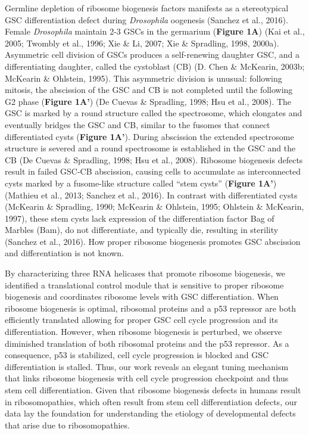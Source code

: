 \documentclass[12pt,twoside]{reedthesis}
\begin{document}
Germline depletion of ribosome biogenesis factors manifests as a
stereotypical GSC differentiation defect during \emph{Drosophila} oogenesis
(Sanchez et al., 2016). Female \emph{Drosophila} maintain 2-3 GSCs in the
germarium (\textbf{Figure 1A}) (Kai et al., 2005; Twombly et al., 1996; Xie \& Li, 2007; Xie \& Spradling, 1998, 2000a). Asymmetric cell division of GSCs produces a
self-renewing daughter GSC, and a differentiating daughter, called the
cystoblast (CB) (D. Chen \& McKearin, 2003b; McKearin \& Ohlstein, 1995). This asymmetric
division is unusual: following mitosis, the abscission of the GSC and CB
is not completed until the following G2 phase (\textbf{Figure 1A'})
(De Cuevas \& Spradling, 1998; Hsu et al., 2008). The GSC is marked by a
round structure called the spectrosome, which elongates and eventually
bridges the GSC and CB, similar to the fusomes that connect
differentiated cysts (\textbf{Figure 1A'}). During abscission the extended
spectrosome structure is severed and a round spectrosome is established
in the GSC and the CB (De Cuevas \& Spradling, 1998; Hsu et al., 2008).
Ribosome biogenesis defects result in failed GSC-CB abscission, causing
cells to accumulate as interconnected cysts marked by a fusome-like
structure called ``stem cysts'' (\textbf{Figure 1A'}) (Mathieu et al., 2013; Sanchez et al., 2016). In contrast with differentiated cysts
(McKearin \& Spradling, 1990; McKearin \& Ohlstein, 1995; Ohlstein \& McKearin, 1997), these stem cysts lack
expression of the differentiation factor Bag of Marbles (Bam), do not
differentiate, and typically die, resulting in sterility
(Sanchez et al., 2016). How proper ribosome biogenesis promotes GSC
abscission and differentiation is not known.

By characterizing three RNA helicases that promote ribosome biogenesis,
we identified a translational control module that is sensitive to proper
ribosome biogenesis and coordinates ribosome levels with GSC
differentiation. When ribosome biogenesis is optimal, ribosomal proteins
and a p53 repressor are both efficiently translated allowing for proper
GSC cell cycle progression and its differentiation. However, when
ribosome biogenesis is perturbed, we observe diminished translation of
both ribosomal proteins and the p53 repressor. As a consequence, p53 is
stabilized, cell cycle progression is blocked and GSC differentiation is
stalled. Thus, our work reveals an elegant tuning mechanism that links
ribosome biogenesis with cell cycle progression checkpoint and thus stem
cell differentiation. Given that ribosome biogenesis defects in humans
result in ribosomopathies, which often result from stem cell
differentiation defects, our data lay the foundation for understanding
the etiology of developmental defects that arise due to ribosomopathies.
\end{document}
